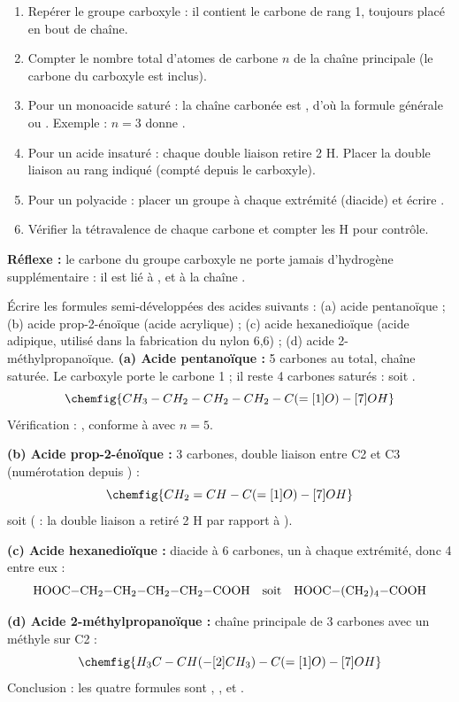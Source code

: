 \documentclass[11pt]{article}
\newcommand{\cle}[1]{{\popxbold\color{popdark}#1}}
\begin{document}
\begin{methode}
\begin{enumerate}
\item Repérer le \cle{groupe carboxyle}  : il contient le carbone de rang 1, toujours placé en bout de chaîne.
\item Compter le nombre total d'atomes de carbone $n$ de la chaîne principale (le carbone du carboxyle est inclus).
\item Pour un \cle{monoacide saturé} : la chaîne carbonée est , d'où la formule générale  ou . Exemple : $n=3$ donne .
\item Pour un \cle{acide insaturé} : chaque double liaison  retire 2 H. Placer la double liaison au rang indiqué (compté depuis le carboxyle).
\item Pour un \cle{polyacide} : placer un groupe  à chaque extrémité (diacide) et écrire .
\item Vérifier la tétravalence de chaque carbone et compter les H pour contrôle.
\end{enumerate}
\textbf{Réflexe :} le carbone du groupe carboxyle ne porte jamais d'hydrogène supplémentaire : il est lié à ,  et à la chaîne .
\end{methode}

\begin{exoresolu}
Écrire les formules semi-développées des acides suivants : (a) acide pentanoïque ; (b) acide prop-2-énoïque (acide acrylique) ; (c) acide hexanedioïque (acide adipique, utilisé dans la fabrication du nylon 6,6) ; (d) acide 2-méthylpropanoïque.
\tcblower
\textbf{(a) Acide pentanoïque :} 5 carbones au total, chaîne saturée. Le carboxyle porte le carbone 1 ; il reste 4 carbones saturés :  soit .
\[ \chemfig{CH_3-CH_2-CH_2-CH_2-C(=[1]O)-[7]OH} \]
Vérification : , conforme à  avec $n=5$.

\textbf{(b) Acide prop-2-énoïque :} 3 carbones, double liaison entre C2 et C3 (numérotation depuis ) :
\[ \chemfig{CH_2=CH-C(=[1]O)-[7]OH} \]
soit  ( : la double liaison a retiré 2 H par rapport à ).

\textbf{(c) Acide hexanedioïque :} diacide à 6 carbones, un  à chaque extrémité, donc 4  entre eux :
\[ \ce{HOOC-CH2-CH2-CH2-CH2-COOH} \quad \text{soit} \quad \ce{HOOC-(CH2)4-COOH} \]

\textbf{(d) Acide 2-méthylpropanoïque :} chaîne principale de 3 carbones avec un méthyle sur C2 :
\[ \chemfig{H_3C-CH(-[2]CH_3)-C(=[1]O)-[7]OH} \]
Conclusion : les quatre formules sont , ,  et .
\end{exoresolu}
\end{document}
